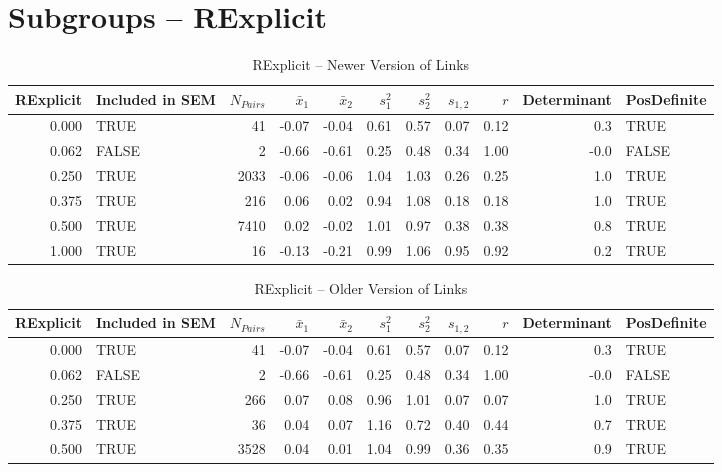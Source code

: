 \documentclass{article}\usepackage[]{graphicx}\usepackage[]{color}
\begin{document}
\section{Subgroups --  RExplicit }%
\begin{table}[ht]
\centering
\begin{tabular}{rlrrrrrrrrl}
  \hline
RExplicit & Included in SEM & $N_{Pairs}$ & $\bar{x}_1$ & $\bar{x}_2$ & $s_1^2$ & $s_2^2$ & $s_{1,2}$ & $r$ & Determinant & PosDefinite \\ 
  \hline
0.000 & TRUE & 41 & -0.07 & -0.04 & 0.61 & 0.57 & 0.07 & 0.12 & 0.3 & TRUE \\ 
  0.062 & FALSE & 2 & -0.66 & -0.61 & 0.25 & 0.48 & 0.34 & 1.00 & -0.0 & FALSE \\ 
  0.250 & TRUE & 2033 & -0.06 & -0.06 & 1.04 & 1.03 & 0.26 & 0.25 & 1.0 & TRUE \\ 
  0.375 & TRUE & 216 & 0.06 & 0.02 & 0.94 & 1.08 & 0.18 & 0.18 & 1.0 & TRUE \\ 
  0.500 & TRUE & 7410 & 0.02 & -0.02 & 1.01 & 0.97 & 0.38 & 0.38 & 0.8 & TRUE \\ 
  1.000 & TRUE & 16 & -0.13 & -0.21 & 0.99 & 1.06 & 0.95 & 0.92 & 0.2 & TRUE \\ 
   \hline
\end{tabular}
\caption{RExplicit -- Newer Version of Links} 
\end{table}
\begin{table}[ht]
\centering
\begin{tabular}{rlrrrrrrrrl}
  \hline
RExplicit & Included in SEM & $N_{Pairs}$ & $\bar{x}_1$ & $\bar{x}_2$ & $s_1^2$ & $s_2^2$ & $s_{1,2}$ & $r$ & Determinant & PosDefinite \\ 
  \hline
0.000 & TRUE & 41 & -0.07 & -0.04 & 0.61 & 0.57 & 0.07 & 0.12 & 0.3 & TRUE \\ 
  0.062 & FALSE & 2 & -0.66 & -0.61 & 0.25 & 0.48 & 0.34 & 1.00 & -0.0 & FALSE \\ 
  0.250 & TRUE & 266 & 0.07 & 0.08 & 0.96 & 1.01 & 0.07 & 0.07 & 1.0 & TRUE \\ 
  0.375 & TRUE & 36 & 0.04 & 0.07 & 1.16 & 0.72 & 0.40 & 0.44 & 0.7 & TRUE \\ 
  0.500 & TRUE & 3528 & 0.04 & 0.01 & 1.04 & 0.99 & 0.36 & 0.35 & 0.9 & TRUE \\ 
   \hline
\end{tabular}
\caption{RExplicit -- Older Version of Links} 
\end{table}
\newpage 
\end{document}

